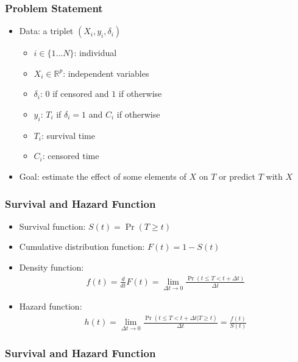 \documentclass[aspectratio=169, 12pt]{beamer}
\begin{document}
	\begin{frame}
	\frametitle{Problem Statement}
	\begin{itemize}
	\item Data: a triplet $(X_i, y_i, \delta_i)$
	\begin{itemize}
	\item $i \in \{1 \dots N\}$: individual 
	\item $X_i \in \mathbb{R}^p$: independent variables
	\item $\delta_i$: $0$ if censored and $1$ if otherwise 
	\item $y_i$: $T_i$ if $\delta_i = 1$ and $C_i$ if otherwise 
	\item $T_i$: survival time
	\item $C_i$: censored time

	\end{itemize}
	\item Goal: estimate the effect of some elements of $X$ on $T$ or predict $T$ with $X$

	\end{itemize}
	\end{frame}

	\begin{frame}
	\frametitle{Survival and Hazard Function}
	\begin{itemize}
	\item Survival function: $S(t) = \Pr(T \geq t)$
	\item Cumulative distribution function: $F(t) = 1 - S(t)$
	\item Density function:
	\begin{eqnarray*}
	f(t) = \frac{d}{dt}F(t) = \lim_{\Delta t \to 0}\frac{\Pr(t \leq T < t + \Delta t)}{\Delta t}
	\end{eqnarray*}
	\item Hazard function:
	\begin{eqnarray*}
	h(t) = \lim_{\Delta t \to 0}\frac{\Pr(t \leq T < t + \Delta t | T \geq t)}{\Delta t} = \frac{f(t)}{S(t)}
	\end{eqnarray*}

	\end{itemize}
	\end{frame}

	\begin{frame}
	\frametitle{Survival and Hazard Function}
	\end{frame}
\end{document}
